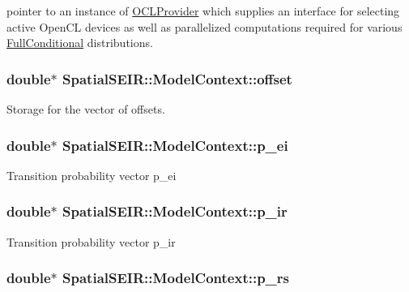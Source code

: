 pointer to an instance of \hyperlink{classSpatialSEIR_1_1OCLProvider}{O\-C\-L\-Provider} which supplies an interface for selecting active Open\-C\-L devices as well as parallelized computations required for various \hyperlink{classSpatialSEIR_1_1FullConditional}{Full\-Conditional} distributions. \hypertarget{classSpatialSEIR_1_1ModelContext_aedc2450556dd5cd0b30a0a1100843f81}{
\subsubsection[{offset}]{\setlength{\rightskip}{0pt plus 5cm}double$\ast$ Spatial\-S\-E\-I\-R\-::\-Model\-Context\-::offset}}\label{classSpatialSEIR_1_1ModelContext_aedc2450556dd5cd0b30a0a1100843f81}
Storage for the vector of offsets. \hypertarget{classSpatialSEIR_1_1ModelContext_ae0827d89df6c5eeca75216149e70b74c}{
\subsubsection[{p\-\_\-ei}]{\setlength{\rightskip}{0pt plus 5cm}double$\ast$ Spatial\-S\-E\-I\-R\-::\-Model\-Context\-::p\-\_\-ei}}\label{classSpatialSEIR_1_1ModelContext_ae0827d89df6c5eeca75216149e70b74c}
Transition probability vector p\-\_\-ei \hypertarget{classSpatialSEIR_1_1ModelContext_ad313e395d6c4bc5ca5cbda8c189a67da}{
\subsubsection[{p\-\_\-ir}]{\setlength{\rightskip}{0pt plus 5cm}double$\ast$ Spatial\-S\-E\-I\-R\-::\-Model\-Context\-::p\-\_\-ir}}\label{classSpatialSEIR_1_1ModelContext_ad313e395d6c4bc5ca5cbda8c189a67da}
Transition probability vector p\-\_\-ir \hypertarget{classSpatialSEIR_1_1ModelContext_a07133c92757c4de3a525ad921de527d5}{
\subsubsection[{p\-\_\-rs}]{\setlength{\rightskip}{0pt plus 5cm}double$\ast$ Spatial\-S\-E\-I\-R\-::\-Model\-Context\-::p\-\_\-rs}}\label{classSpatialSEIR_1_1ModelContext_a07133c92757c4de3a525ad921de527d5}
